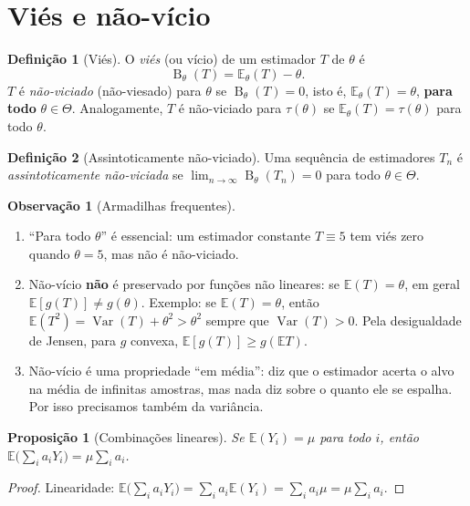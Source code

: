 \documentclass[11pt,a4paper]{article}
\theoremstyle{definition}
\newtheorem{definicao}{Definição}[section]
\newtheorem{observacao}{Observação}[section]
\theoremstyle{plain}
\newtheorem{proposicao}[teorema]{Proposição}
\newcommand{\E}{\mathbb{E}}
\newcommand{\Var}{\operatorname{Var}}
\newcommand{\B}{\operatorname{B}}
\begin{document}
\section{Viés e não-vício}

\begin{definicao}[Viés]
O \emph{viés} (ou vício) de um estimador $T$ de $\theta$ é
\[
\B_\theta(T)=\E_\theta(T)-\theta .
\]
$T$ é \emph{não-viciado} (não-viesado) para $\theta$ se $\B_\theta(T)=0$, isto é, $\E_\theta(T)=\theta$, \textbf{para todo} $\theta\in\Theta$. Analogamente, $T$ é não-viciado para $\tau(\theta)$ se $\E_\theta(T)=\tau(\theta)$ para todo $\theta$.
\end{definicao}

\begin{definicao}[Assintoticamente não-viciado]
Uma sequência de estimadores $T_n$ é \emph{assintoticamente não-viciada} se $\lim_{n\to\infty}\B_\theta(T_n)=0$ para todo $\theta\in\Theta$.
\end{definicao}

\begin{observacao}[Armadilhas frequentes]
\begin{enumerate}[label=(\alph*)]
\item ``Para todo $\theta$'' é essencial: um estimador constante $T\equiv 5$ tem viés zero quando $\theta=5$, mas não é não-viciado.
\item Não-vício \textbf{não} é preservado por funções não lineares: se $\E(T)=\theta$, em geral $\E[g(T)]\neq g(\theta)$. Exemplo: se $\E(T)=\theta$, então $\E(T^2)=\Var(T)+\theta^2>\theta^2$ sempre que $\Var(T)>0$. Pela desigualdade de Jensen, para $g$ convexa, $\E[g(T)]\ge g(\E T)$.
\item Não-vício é uma propriedade ``em média'': diz que o estimador acerta o alvo na média de infinitas amostras, mas nada diz sobre o quanto ele se espalha. Por isso precisamos também da variância.
\end{enumerate}
\end{observacao}

\begin{proposicao}[Combinações lineares]\label{prop:comblin}
Se $\E(Y_i)=\mu$ para todo $i$, então $\E\big(\sum_i a_iY_i\big)=\mu\sum_i a_i$.
\end{proposicao}
\begin{proof}
Linearidade: $\E\big(\sum_i a_iY_i\big)=\sum_i a_i\E(Y_i)=\sum_i a_i\mu=\mu\sum_i a_i$.
\end{proof}
\end{document}
